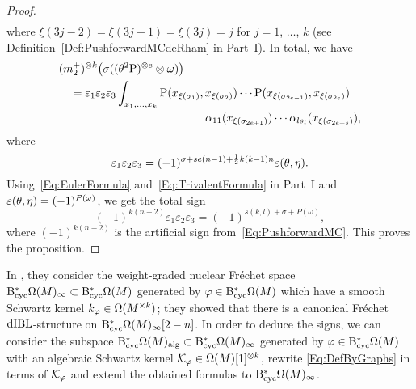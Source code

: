 \documentclass[\MainFolder/Text.tex]{subfiles}
\begin{document}
\begin{proof}
\begin{align*}
\end{align*}
where $\xi(3j-2) = \xi(3j-1) = \xi(3j) = j$ for $j=1$, $\dotsc$, $k$ (see Definition~\ref{Def:PushforwardMCdeRham} in Part~I). In total, we have 
\begin{align*} &(m_2^+)^{\otimes k} \bigl(\sigma((\SuspU^{ 2} \Prpg)^{\otimes e} \otimes \omega)\bigr) \\ 
&\quad = \begin{multlined}[t]\varepsilon_1 \varepsilon_2 \varepsilon_3  \int_{x_1,\dotsc,x_k} \Prpg(x_{\xi(\sigma_1)},x_{\xi(\sigma_2)}) \dotsm  \Prpg(x_{\xi(\sigma_{2e-1})},x_{\xi(\sigma_{2e})}) \\ \alpha_{11}(x_{\xi(\sigma_{2e+1})}) \dotsm \alpha_{ls_{l}}(x_{\xi(\sigma_{2e+s})}),\end{multlined}
\end{align*}
where
$$ \varepsilon_1 \varepsilon_2 \varepsilon_3 = (-1)^{\sigma + s e (n-1)+ \frac{1}{2}k(k-1)n} \varepsilon(\theta,\eta). $$
Using~\eqref{Eq:EulerFormula} and~\eqref{Eq:TrivalentFormula} in Part~I and $\varepsilon(\theta,\eta) = (-1)^{P(\omega)}$, we get the total sign
$$ (-1)^{k(n-2)}\varepsilon_1 \varepsilon_2 \varepsilon_3  = (-1)^{s(k,l) + \sigma + P(\omega)},  $$
where $(-1)^{k(n-2)}$ is the artificial sign from~\eqref{Eq:PushforwardMC}. This proves the proposition.
\end{proof}


\begin{Remark}\label{Rem:Frechet}
In \cite[Section~13]{Cieliebak2015}, they consider the weight-graded nuclear Fr\'echet space $\mathrm{B}_{\mathrm{cyc}}^* \Omega(M)_{\infty} \subset \mathrm{B}_{\mathrm{cyc}}^* \Omega(M)$ generated by $\varphi\in \mathrm{B}_{\mathrm{cyc}}^* \Omega(M)$ which have a smooth Schwartz kernel $k_\varphi\in \Omega(M^{\times k})$; they showed that there is a canonical Fr\'echet $\mathrm{dIBL}$-structure on $\mathrm{B}_{\mathrm{cyc}}^* \Omega(M)_{\infty}[2-n]$. In order to deduce the signs, we can consider the subspace $\mathrm{B}_{\mathrm{cyc}}^* \Omega(M)_{\mathrm{alg}} \subset \mathrm{B}_{\mathrm{cyc}}^* \Omega(M)_\infty$ generated by $\varphi\in \mathrm{B}_{\mathrm{cyc}}^* \Omega(M)$ with an algebraic Schwartz kernel $\mathcal{K}_\varphi \in \Omega(M)[1]^{\otimes k}$, rewrite \eqref{Eq:DefByGraphs} in terms of $\mathcal{K}_\varphi$ and extend the obtained formulas to $\mathrm{B}_{\mathrm{cyc}}^* \Omega(M)_\infty$.
\end{Remark}
\end{document}
